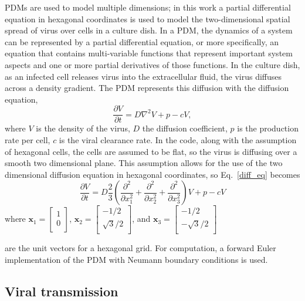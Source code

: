PDMs are used to model multiple dimensions; in this work a partial differential equation in hexagonal coordinates is used to model the two-dimensional spatial spread of virus over cells in a culture dish. In a PDM, the dynamics of a system can be represented by a partial differential equation, or more specifically, an equation that contains multi-variable functions that represent important system aspects and one or more partial derivatives of those functions. In the culture dish, as an infected cell releases virus into the extracellular fluid, the virus diffuses across a density gradient. The PDM represents this diffusion with the diffusion equation, 
\begin{equation}
\frac{\partial V}{\partial t}=D \nabla^{2}V + p - cV, \label{diff_eq}
\end{equation}
where $V$ is the density of the virus, $D$ the diffusion coefficient, $p$ is the production rate per cell, $c$ is the viral clearance rate. In the code, along with the assumption of hexagonal cells, the cells are assumed to be flat, so the virus is diffusing over a smooth two dimensional plane. This assumption allows for the use of the two dimensional diffusion equation in hexagonal coordinates, so Eq.\ \eqref{diff_eq} becomes 
$$\frac{\partial V}{\partial t} = D\frac{2}{3} \left (\frac{\partial^2}{\partial x^2_1}+\frac{\partial^2}{\partial x^2_2}+\frac{\partial^2}{\partial x^2_3}\right )V + p -cV$$ 
where  
$\textbf{x}_1=
\left [
    \begin{array}{c}
        1 \\
        0 \\
    \end{array}
\right ]$, 
$\textbf{x}_2=
\left [
    \begin{array}{c}
        -1/2 \\
        \sqrt{3}/2 \\
    \end{array}
\right ]$, and 
$\textbf{x}_3=
\left [
    \begin{array}{c}
        -1/2 \\
        -\sqrt{3}/2 \\
    \end{array}
\right ]$ 

are the unit vectors for a hexagonal grid. For computation, a forward Euler implementation of the PDM with Neumann boundary conditions is used.

\subsection{Viral transmission} \label{Viral_transmission}

